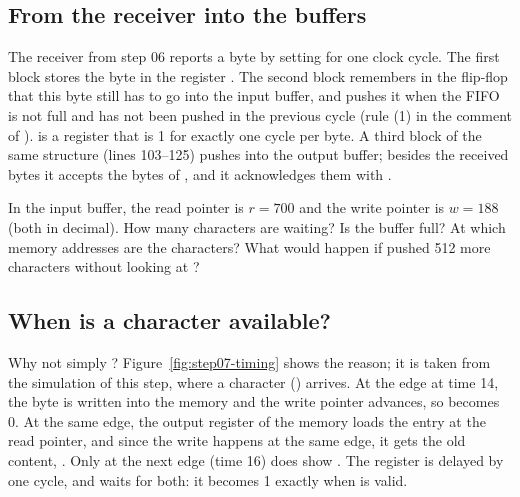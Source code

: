 \subsection*{From the receiver into the buffers}


The receiver from step 06 reports a byte by setting  for one
clock cycle. The first block stores the byte in the register .
The second block remembers in the flip-flop  that this byte
still has to go into the input buffer, and pushes it when the FIFO is not full
and has not been pushed in the previous cycle (rule (1) in the comment of
).  is a register that is 1 for exactly one
cycle per byte. A third block of the same structure (lines 103--125) pushes
into the output buffer; besides the received bytes it accepts the bytes of
, and it acknowledges them with .

\begin{exercise}
\label{ex:step07-pointers}
In the input buffer, the read pointer is $r = 700$ and the write pointer is
$w = 188$ (both in decimal). How many characters are waiting? Is the buffer
full? At which memory addresses are the characters? What would happen if
 pushed 512 more characters without looking at ?
\end{exercise}

\subsection*{When is a character available?}


Why not simply ? Figure~\ref{fig:step07-timing}
shows the reason; it is taken from the simulation of this step, where a
character  () arrives. At the edge at time 14, the byte is
written into the memory and the write pointer advances, so  becomes
0. At the same edge, the output register of the memory loads the entry at the
read pointer, and since the write happens at the same edge, it gets the old
content, . Only at the next edge (time 16) does  show
. The register  is  delayed by one
cycle, and  waits for both: it becomes 1 exactly when
 is valid.

